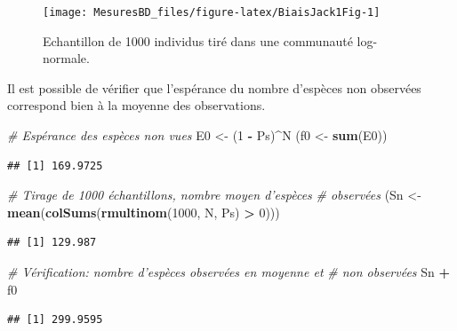 \documentclass[
  11pt,
  french,
  a4paper,
  extrafontsizes,onecolumn,openright
  ]{memoir}
\newenvironment{Shaded}{\begin{snugshade}}{\end{snugshade}}
\newcommand{\CommentTok}[1]{\textcolor[rgb]{0.56,0.35,0.01}{\textit{#1}}}
\newcommand{\DecValTok}[1]{\textcolor[rgb]{0.00,0.00,0.81}{#1}}
\newcommand{\KeywordTok}[1]{\textcolor[rgb]{0.13,0.29,0.53}{\textbf{#1}}}
\newcommand{\NormalTok}[1]{#1}
\newcommand{\OperatorTok}[1]{\textcolor[rgb]{0.81,0.36,0.00}{\textbf{#1}}}
\newcommand{\StringTok}[1]{\textcolor[rgb]{0.31,0.60,0.02}{#1}}
\begin{document}
\begin{figure}

{\centering \texttt{[image: MesuresBD\_files/figure-latex/BiaisJack1Fig-1]} 

}

\caption{Echantillon de 1000 individus tiré dans une communauté log-normale.}\label{fig:BiaisJack1Fig}
\end{figure}

\normalsize

Il est possible de vérifier que l'espérance du nombre d'espèces non observées correspond bien à la moyenne des observations.

\scriptsize

\begin{Shaded}
\begin{Highlighting}[]
\CommentTok{# Espérance des espèces non vues}
\NormalTok{E0 <-}\StringTok{ }\NormalTok{(}\DecValTok{1} \OperatorTok{-}\StringTok{ }\NormalTok{Ps)}\OperatorTok{^}\NormalTok{N}
\NormalTok{(f0 <-}\StringTok{ }\KeywordTok{sum}\NormalTok{(E0))}
\end{Highlighting}
\end{Shaded}

\begin{verbatim}
## [1] 169.9725
\end{verbatim}

\begin{Shaded}
\begin{Highlighting}[]
\CommentTok{# Tirage de 1000 échantillons, nombre moyen d'espèces}
\CommentTok{# observées}
\NormalTok{(Sn <-}\StringTok{ }\KeywordTok{mean}\NormalTok{(}\KeywordTok{colSums}\NormalTok{(}\KeywordTok{rmultinom}\NormalTok{(}\DecValTok{1000}\NormalTok{, N, Ps) }\OperatorTok{>}\StringTok{ }\DecValTok{0}\NormalTok{)))}
\end{Highlighting}
\end{Shaded}

\begin{verbatim}
## [1] 129.987
\end{verbatim}

\begin{Shaded}
\begin{Highlighting}[]
\CommentTok{# Vérification: nombre d'espèces observées en moyenne et}
\CommentTok{# non observées}
\NormalTok{Sn }\OperatorTok{+}\StringTok{ }\NormalTok{f0}
\end{Highlighting}
\end{Shaded}

\begin{verbatim}
## [1] 299.9595
\end{verbatim}
\end{document}
